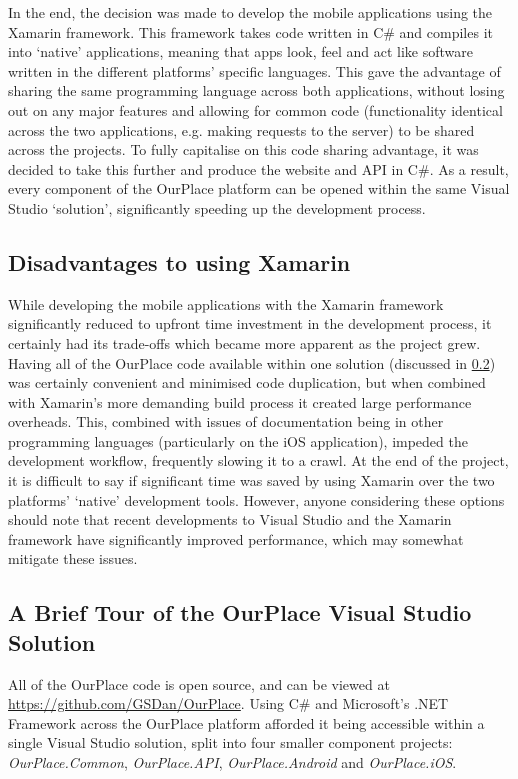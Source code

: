 In the end, the decision was made to develop the mobile applications using the
Xamarin framework. This framework takes code written in C\# and compiles it into
`native' applications, meaning that apps look, feel and act like software
written in the different platforms' specific languages. This gave the advantage
of sharing the same programming language across both applications, without
losing out on any major features and allowing for common code (functionality
identical across the two applications, e.g. making requests to the server) to be
shared across the projects. To fully capitalise on this code sharing advantage,
it was decided to take this further and produce the website and API in C\#. As a
result, every component of the OurPlace platform can be opened within the same
Visual Studio `solution', significantly speeding up the development process.

\subsection{Disadvantages to using Xamarin}
While developing the mobile applications with the Xamarin framework
significantly reduced to upfront time investment in the development process, it
certainly had its trade-offs which became more apparent as the project grew.
Having all of the OurPlace code available within one solution (discussed in
\ref{sec:OurPlaceSolution}) was certainly convenient and minimised code
duplication, but when combined with Xamarin's more demanding build process it
created large performance overheads. This, combined with issues of documentation
being in other programming languages (particularly on the iOS application),
impeded the development workflow, frequently slowing it to a crawl. At the end
of the project, it is difficult to say if significant time was saved by using
Xamarin over the two platforms' `native' development tools. However, anyone
considering these options should note that recent developments to Visual Studio
and the Xamarin framework have significantly improved performance, which may somewhat
mitigate these issues.

\subsection{A Brief Tour of the OurPlace Visual Studio Solution}
\label{sec:OurPlaceSolution}
All of the OurPlace code is open source, and can be viewed at
\url{https://github.com/GSDan/OurPlace}. Using C\# and Microsoft's .NET Framework
across the OurPlace platform afforded it being accessible within a single Visual
Studio solution, split into four smaller component projects:
\textit{OurPlace.Common}, \textit{OurPlace.API}, \textit{OurPlace.Android} and
\textit{OurPlace.iOS}.

